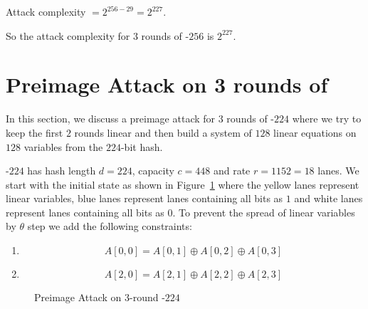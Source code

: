 Attack complexity $ = 2^{256 - 29} = 2^{227}$.

So the attack complexity for $3$ rounds of \KECCAK{}-$256$ is $2^{227}$.

\section{Preimage Attack on 3 rounds of }

In this section, we discuss a preimage attack for $3$ rounds of \KECCAK{}-$224$ where we try to keep the first $2$ rounds linear and then build a system of $128$ linear equations on $128$ variables from the $224$-bit hash.

\KECCAK{}-$224$ has hash length $d=224$, capacity $c=448$ and rate $r = 1152 = 18$ lanes. We start with the initial state as shown in Figure~\ref{fig:3rkeccak224} where the yellow lanes represent linear variables, blue lanes represent lanes containing all bits as $1$ and white lanes represent lanes containing all bits as $0$. To prevent the spread of linear variables by $\theta$ step we add the following constraints:

\begin{enumerate}
	\item \[
	A[0,0] = A[0,1] \oplus A[0,2] \oplus A[0, 3]
	\]
	\item \[
	A[2,0] = A[2,1] \oplus A[2,2] \oplus A[2,3]
	\]
\end{enumerate}

\begin{figure}[H]
	\caption{Preimage Attack on 3-round \KECCAK-$224$}
	\label{fig:3rkeccak224}
\end{figure}


